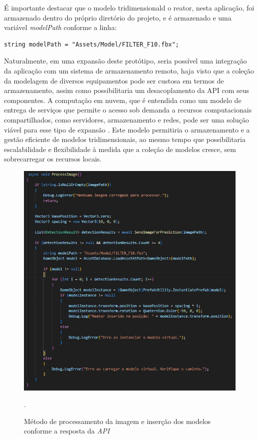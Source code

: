 É importante destacar que o modelo tridimensionald o reator, nesta aplicação, foi armazenado dentro do próprio diretório do projeto, e é armazenado e uma variável \textit{modelPath} conforme a linha:

\begin{lstlisting}
string modelPath = "Assets/Model/FILTER_F10.fbx";
\end{lstlisting}

Naturalmente, em uma expansão deste protótipo, seria possível uma integração da aplicação com um sistema de armazenamento remoto, haja visto que a coleção da modelagem de diversos equipamentos pode ser custosa em termos de armazenamento, assim como possibilitaria um desacoplamento da API com seus componentes. A computação em nuvem, que é entendida como um modelo de entrega de serviços que permite o acesso sob demanda a recursos computacionais compartilhados, como servidores, armazenamento e redes, pode ser uma solução viável para esse tipo de expansão \cite{mell2011nist}. Este modelo permitiria o armazenamento e a gestão eficiente de modelos tridimensionais, ao mesmo tempo que possibilitaria escalabilidade e flexibilidade à medida que a coleção de modelos cresce, sem sobrecarregar os recursos locais.

\begin{figure}[!h]
    \centering
    \begin{minipage}{0.7\linewidth}
    \centering
    \captionsetup{justification=centering,margin=0.5cm,font=small}
    \includegraphics[width=1\linewidth]{img/cap5/process-image.jpeg}
    \caption{Método de processamento da imagem e inserção dos modelos conforme a resposta da \textit{API}}.
    \label{fig:metodo-disposicao}
    \end{minipage}
\end{figure}

